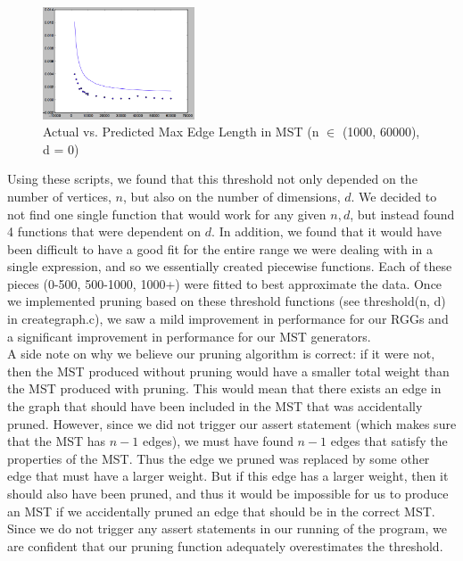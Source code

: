 \documentclass[12pt]{article}
\begin{document}
\begin{figure}
\centering
\includegraphics[width=0.4\textwidth]{img/knd0n3.png}
\caption{Actual vs. Predicted Max Edge Length in MST (n $\in$ (1000, 60000), d = 0)}
\end{figure}

Using these scripts, we found that this threshold not only depended on the number of vertices, $n$, but also on the number of dimensions, $d$. We decided to not find one single function that would work for any given $n, d$, but instead found 4 functions that were dependent on $d$. In addition, we found that it would have been difficult to have a good fit for the entire range we were dealing with in a single expression, and so we essentially created piecewise functions. Each of these pieces (0-500, 500-1000, 1000+) were fitted to best approximate the data. Once we implemented pruning based on these threshold functions (see threshold(n, d) in creategraph.c), we saw a mild improvement in performance for our RGGs and a significant improvement in performance for our MST generators. \\

A side note on why we believe our pruning algorithm is correct: if it were not, then the MST produced without pruning would have a smaller total weight than the MST produced with pruning. This would mean that there exists an edge in the graph that should have been included in the MST that was accidentally pruned. However, since we did not trigger our assert statement (which makes sure that the MST has $n - 1$ edges), we must have found $n - 1$ edges that satisfy the properties of the MST. Thus the edge we pruned was replaced by some other edge that must have a larger weight. But if this edge has a larger weight, then it should also have been pruned, and thus it would be impossible for us to produce an MST if we accidentally pruned an edge that should be in the correct MST. Since we do not trigger any assert statements in our running of the program, we are confident that our pruning function adequately overestimates the threshold. \\
\end{document}
